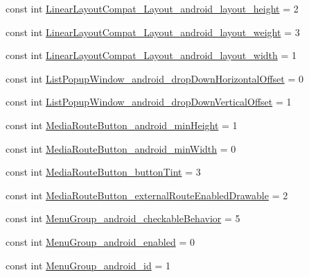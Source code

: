 \begin{DoxyCompactItemize}
\item 
const int \mbox{\hyperlink{class_f_w_p_s___app_1_1_droid_1_1_resource_1_1_styleable_a622b81aca0e2d92e9c4a5a874efa0e94}{Linear\+Layout\+Compat\+\_\+\+Layout\+\_\+android\+\_\+layout\+\_\+height}} = 2
\item 
const int \mbox{\hyperlink{class_f_w_p_s___app_1_1_droid_1_1_resource_1_1_styleable_adc11a4e25a428d9abfa3a0c30a33d139}{Linear\+Layout\+Compat\+\_\+\+Layout\+\_\+android\+\_\+layout\+\_\+weight}} = 3
\item 
const int \mbox{\hyperlink{class_f_w_p_s___app_1_1_droid_1_1_resource_1_1_styleable_ae29fc264aebbaf037b22c64d267d8fbd}{Linear\+Layout\+Compat\+\_\+\+Layout\+\_\+android\+\_\+layout\+\_\+width}} = 1
\item 
const int \mbox{\hyperlink{class_f_w_p_s___app_1_1_droid_1_1_resource_1_1_styleable_a4b9643e4e5af265cc698809b4c650c7a}{List\+Popup\+Window\+\_\+android\+\_\+drop\+Down\+Horizontal\+Offset}} = 0
\item 
const int \mbox{\hyperlink{class_f_w_p_s___app_1_1_droid_1_1_resource_1_1_styleable_a6fa5791ab3d9729f3b783ee0854b0bf5}{List\+Popup\+Window\+\_\+android\+\_\+drop\+Down\+Vertical\+Offset}} = 1
\item 
const int \mbox{\hyperlink{class_f_w_p_s___app_1_1_droid_1_1_resource_1_1_styleable_a14916bb2ff58ad4dd9e149f022cff00a}{Media\+Route\+Button\+\_\+android\+\_\+min\+Height}} = 1
\item 
const int \mbox{\hyperlink{class_f_w_p_s___app_1_1_droid_1_1_resource_1_1_styleable_abcf24eccbc3e7ff6a4ffe00445480973}{Media\+Route\+Button\+\_\+android\+\_\+min\+Width}} = 0
\item 
const int \mbox{\hyperlink{class_f_w_p_s___app_1_1_droid_1_1_resource_1_1_styleable_afe50434f49036c6696520571325a9708}{Media\+Route\+Button\+\_\+button\+Tint}} = 3
\item 
const int \mbox{\hyperlink{class_f_w_p_s___app_1_1_droid_1_1_resource_1_1_styleable_a12b60ec287c43bccebe1a8c82e92742f}{Media\+Route\+Button\+\_\+external\+Route\+Enabled\+Drawable}} = 2
\item 
const int \mbox{\hyperlink{class_f_w_p_s___app_1_1_droid_1_1_resource_1_1_styleable_a5b71cab6cbb183f28604494a0921ed1f}{Menu\+Group\+\_\+android\+\_\+checkable\+Behavior}} = 5
\item 
const int \mbox{\hyperlink{class_f_w_p_s___app_1_1_droid_1_1_resource_1_1_styleable_a8a149b923cf960d506543fbabce29fb8}{Menu\+Group\+\_\+android\+\_\+enabled}} = 0
\item 
const int \mbox{\hyperlink{class_f_w_p_s___app_1_1_droid_1_1_resource_1_1_styleable_ae4c4c66c8e746a3ee560b699c52c2f5f}{Menu\+Group\+\_\+android\+\_\+id}} = 1

\end{DoxyCompactItemize}
